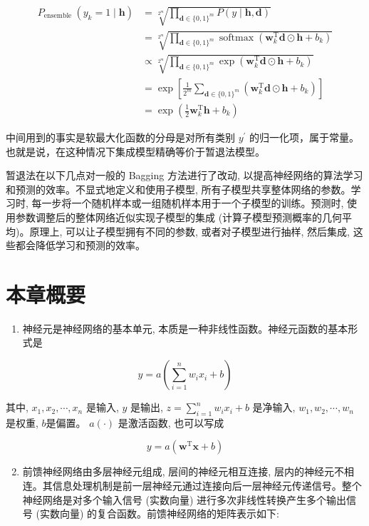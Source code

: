 \documentclass[10pt]{article}
\begin{document}
\begin{CJK*}{UTF8}{bsmi}
\begin{align*}
P_{\text {ensemble }}\left(y_{k}=1 \mid \boldsymbol{h}\right) & =\sqrt[2^{m}]{\prod_{\boldsymbol{d} \in\{0,1\}^{m}} P(y \mid \boldsymbol{h}, \boldsymbol{d})} \\
& =\sqrt[2^{m}]{\prod_{\boldsymbol{d} \in\{0,1\}^{m}} \operatorname{softmax}\left(\boldsymbol{w}_{k}^{\mathrm{T}} \boldsymbol{d} \odot \boldsymbol{h}+b_{k}\right)} \\
& \propto \sqrt[2^{m}]{\prod_{\boldsymbol{d} \in\{0,1\}^{m}} \exp \left(\boldsymbol{w}_{k}^{\mathrm{T}} \boldsymbol{d} \odot \boldsymbol{h}+b_{k}\right)} \\
& =\exp \left[\frac{1}{2^{m}} \sum_{\boldsymbol{d} \in\{0,1\}^{m}}\left(\boldsymbol{w}_{k}^{\mathrm{T}} \boldsymbol{d} \odot \boldsymbol{h}+b_{k}\right)\right] \\
& =\exp \left(\frac{1}{2} \boldsymbol{w}_{k}^{\mathrm{T}} \boldsymbol{h}+b_{k}\right) \tag{23.75}
\end{align*}


中间用到的事实是软最大化函数的分母是对所有类别 $y^{\prime}$ 的归一化项，属于常量。也就是说，在这种情况下集成模型精确等价于暂退法模型。

暂退法在以下几点对一般的 Bagging 方法进行了改动, 以提高神经网络的算法学习和预测的效率。不显式地定义和使用子模型, 所有子模型共享整体网络的参数。学习时, 每一步将一个随机样本或一组随机样本用于一个子模型的训练。预测时, 使用参数调整后的整体网络近似实现子模型的集成 (计算子模型预测概率的几何平均)。原理上, 可以让子模型拥有不同的参数, 或者对子模型进行抽样, 然后集成, 这些都会降低学习和预测的效率。

\section*{本章概要}
\begin{enumerate}
  \item 神经元是神经网络的基本单元, 本质是一种非线性函数。神经元函数的基本形式是
\end{enumerate}

$$
y=a\left(\sum_{i=1}^{n} w_{i} x_{i}+b\right)
$$

其中, $x_{1}, x_{2}, \cdots, x_{n}$ 是输入, $y$ 是输出, $z=\sum_{i=1}^{n} w_{i} x_{i}+b$ 是净输入, $w_{1}, w_{2}, \cdots, w_{n}$ 是权重, $b$是偏置。 $a(\cdot)$ 是激活函数, 也可以写成

$$
y=a\left(\boldsymbol{w}^{\mathrm{T}} \boldsymbol{x}+b\right)
$$

\begin{enumerate}
  \setcounter{enumi}{1}
  \item 前馈神经网络由多层神经元组成, 层间的神经元相互连接, 层内的神经元不相连。其信息处理机制是前一层神经元通过连接向后一层神经元传递信号。整个神经网络是对多个输入信号 (实数向量) 进行多次非线性转换产生多个输出信号 (实数向量) 的复合函数。前馈神经网络的矩阵表示如下:
\end{enumerate}


\end{CJK*}
\end{document}
